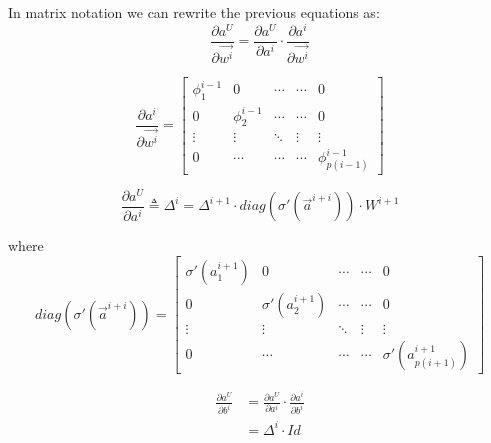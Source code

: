 In matrix notation we can rewrite the previous equations as:
\begin{equation}
 \frac{\partial a^U}{\partial \vec{w^i}} = \frac{\partial a^U}{\partial a^i} \cdot \frac{\partial a^i}{\partial \vec{w^i}}
\end{equation}

\begin{equation}
\frac{\partial a^i}{\partial \vec{w^i}} =
 \begin{bmatrix}
   \phi_1^{i-1}    & 0                & \cdots      & \cdots       & 0  \\
   0               & \phi_2^{i-1}     & \cdots      & \cdots       & 0  \\
   \vdots          & \vdots           & \ddots      & \vdots       &\vdots\\
   0               & \cdots           & \cdots      & \cdots       & \phi^{i-1}_{p(i-1)}
\end{bmatrix}
\end{equation}

\begin{equation}
\frac{\partial a^U}{\partial a^i} \triangleq \Delta^i = \Delta^{i+1} \cdot diag(\sigma'(\vec{a}^{i+i})) \cdot W^{i+1}
\end{equation}

where
\begin{equation}
diag(\sigma'(\vec{a}^{i+i})) =
 \begin{bmatrix}
   \sigma'(a^{i+1}_1)    & 0                & \cdots      & \cdots       & 0  \\
   0                     & \sigma'(a^{i+1}_2)     & \cdots      & \cdots       & 0  \\
   \vdots                & \vdots           & \ddots      & \vdots       &\vdots\\
   0                     & \cdots           & \cdots      & \cdots       &\sigma'(a^{i+1}_{p(i+1)})
\end{bmatrix}
\end{equation}

\begin{align}
\frac{\partial a^U}{\partial b^i} &= \frac{\partial a^U}{\partial a^i} \cdot \frac{\partial a^i}{\partial b^i}\\
&= \Delta^{i} \cdot Id
\end{align}
